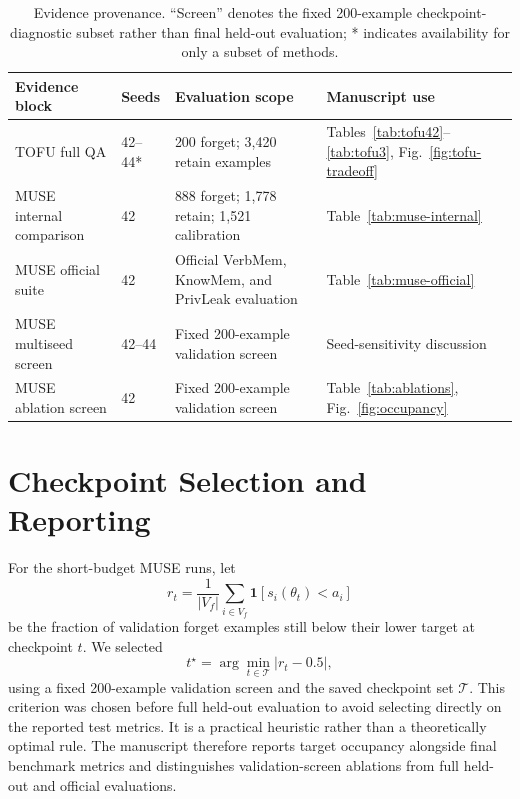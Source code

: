 \documentclass[10pt,twocolumn]{article}
\begin{document}
\begin{table}[H]
\centering
\caption{Evidence provenance. ``Screen'' denotes the fixed 200-example
checkpoint-diagnostic subset rather than final held-out evaluation; * indicates
availability for only a subset of methods.}
\label{tab:appendix-evidence}
\small
\renewcommand{\arraystretch}{1.16}
\setlength{\tabcolsep}{6pt}
\begin{tabular}{@{}L{0.22\textwidth}L{0.09\textwidth}L{0.31\textwidth}L{0.27\textwidth}@{}}
\toprule
{}
Evidence block & Seeds & Evaluation scope & Manuscript use \\
\midrule
TOFU full QA
  & 42--44*
  & 200 forget; 3,420 retain examples
  & Tables~\ref{tab:tofu42}--\ref{tab:tofu3}, Fig.~\ref{fig:tofu-tradeoff} \\
MUSE internal comparison
  & 42
  & 888 forget; 1,778 retain; 1,521 calibration
  & Table~\ref{tab:muse-internal} \\
MUSE official suite
  & 42
  & Official VerbMem, KnowMem, and PrivLeak evaluation
  & Table~\ref{tab:muse-official} \\
MUSE multiseed screen
  & 42--44
  & Fixed 200-example validation screen
  & Seed-sensitivity discussion \\
MUSE ablation screen
  & 42
  & Fixed 200-example validation screen
  & Table~\ref{tab:ablations}, Fig.~\ref{fig:occupancy} \\
\bottomrule
\end{tabular}
\end{table}

\section{Checkpoint Selection and Reporting}
\label{app:selection}

For the short-budget MUSE runs, let
\begin{equation}
  r_t=\frac{1}{|V_f|}\sum_{i\in V_f}
  \mathbf{1}\!\left[s_i(\theta_t)<a_i\right]
\end{equation}
be the fraction of validation forget examples still below their lower target at
checkpoint $t$. We selected
\begin{equation}
  t^\star=\arg\min_{t\in\mathcal{T}} |r_t-0.5|,
\end{equation}
using a fixed 200-example validation screen and the saved checkpoint set
$\mathcal{T}$. This criterion was chosen before full held-out evaluation to
avoid selecting directly on the reported test metrics. It is a practical
heuristic rather than a theoretically optimal rule. The manuscript therefore
reports target occupancy alongside final benchmark metrics and distinguishes
validation-screen ablations from full held-out and official evaluations.
\end{document}
